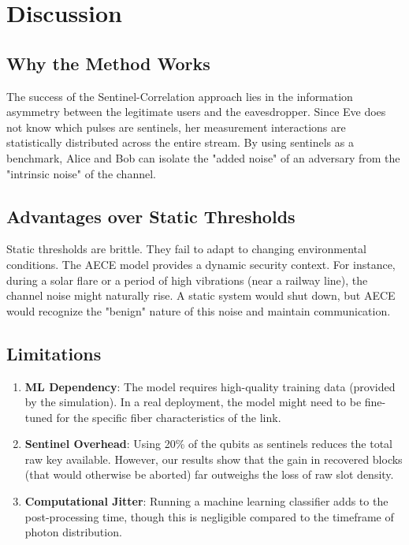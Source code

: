 \documentclass[journal,onecolumn,12pt,draftclsnofoot]{IEEEtran}
\begin{document}
\newpage

\section{Discussion}

\subsection{Why the Method Works}
The success of the Sentinel-Correlation approach lies in the information asymmetry between the legitimate users and the eavesdropper. Since Eve does not know which pulses are sentinels, her measurement interactions are statistically distributed across the entire stream. By using sentinels as a benchmark, Alice and Bob can isolate the "added noise" of an adversary from the "intrinsic noise" of the channel.

\subsection{Advantages over Static Thresholds}
Static thresholds are brittle. They fail to adapt to changing environmental conditions. The AECE model provides a dynamic security context. For instance, during a solar flare or a period of high vibrations (near a railway line), the channel noise might naturally rise. A static system would shut down, but AECE would recognize the "benign" nature of this noise and maintain communication.

\subsection{Limitations}
\begin{enumerate}
    \item \textbf{ML Dependency}: The model requires high-quality training data (provided by the simulation). In a real deployment, the model might need to be fine-tuned for the specific fiber characteristics of the link.
    \item \textbf{Sentinel Overhead}: Using 20\% of the qubits as sentinels reduces the total raw key available. However, our results show that the gain in recovered blocks (that would otherwise be aborted) far outweighs the loss of raw slot density.
    \item \textbf{Computational Jitter}: Running a machine learning classifier adds to the post-processing time, though this is negligible compared to the timeframe of photon distribution.
\end{enumerate}
\end{document}

